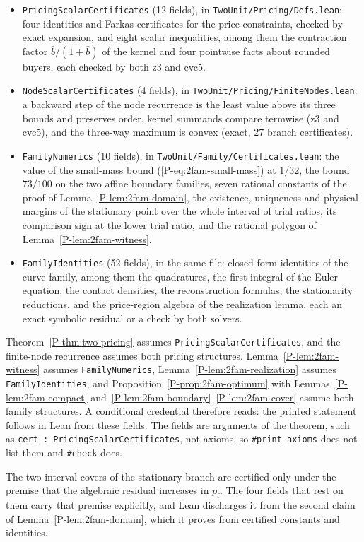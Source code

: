 \documentclass[11pt]{article}
\newcommand{\pref}[1]{\ref*{P-#1}}
\newcommand{\peqref}[1]{(\ref*{P-#1})}
\newcommand{\lean}[1]{\begingroup\def\_{\textunderscore\allowbreak}\texttt{\small #1}\endgroup}
\begin{document}
\begin{itemize}
\item \lean{PricingScalarCertificates} (12 fields), in
\lean{TwoUnit/Pricing/Defs.lean}: four identities and Farkas certificates
for the price constraints, checked by exact expansion, and eight scalar
inequalities, among them the contraction factor $\bar b/(1+\bar b)$ of the
kernel and four pointwise facts about rounded buyers, each checked by both
z3 and cvc5.
\item \lean{NodeScalarCertificates} (4 fields), in
\lean{TwoUnit/Pricing/FiniteNodes.lean}: a backward step of the node
recurrence is the least value above its three bounds and preserves order,
kernel summands compare termwise (z3 and cvc5), and the three-way maximum
is convex (exact, 27 branch certificates).
\item \lean{FamilyNumerics} (10 fields), in
\lean{TwoUnit/Family/Certificates.lean}: the value of the small-mass bound
\peqref{eq:2fam-small-mass} at $1/32$, the bound $73/100$ on the two affine
boundary families, seven rational constants of the proof of
Lemma~\pref{lem:2fam-domain}, the existence, uniqueness and physical
margins of the stationary point over the whole interval of trial ratios,
its comparison sign at the lower trial ratio, and the rational polygon of
Lemma~\pref{lem:2fam-witness}.
\item \lean{FamilyIdentities} (52 fields), in the same file: closed-form
identities of the curve family, among them the quadratures, the first
integral of the Euler equation, the contact densities, the reconstruction
formulas, the stationarity reductions, and the price-region algebra of the
realization lemma, each an exact symbolic residual or a check by both
solvers.
\end{itemize}

Theorem~\pref{thm:two-pricing} assumes \lean{PricingScalarCertificates}, and
the finite-node recurrence assumes both pricing structures.
Lemma~\pref{lem:2fam-witness} assumes \lean{FamilyNumerics},
Lemma~\pref{lem:2fam-realization} assumes \lean{FamilyIdentities}, and
Proposition~\pref{prop:2fam-optimum} with
Lemmas~\pref{lem:2fam-compact} and~\pref{lem:2fam-boundary}--\pref{lem:2fam-cover}
assume both family structures. A conditional credential therefore reads:
the printed statement follows in Lean from these fields. The fields are
arguments of the theorem, such as \lean{cert : PricingScalarCertificates},
not axioms, so \lean{\#print axioms} does not list them and \lean{\#check}
does.

The two interval covers of the stationary branch are certified only under
the premise that the algebraic residual increases in $p_{\mathrm f}$. The
four fields that rest on them carry that premise explicitly, and Lean
discharges it from the second claim of Lemma~\pref{lem:2fam-domain}, which
it proves from certified constants and identities.
\end{document}
